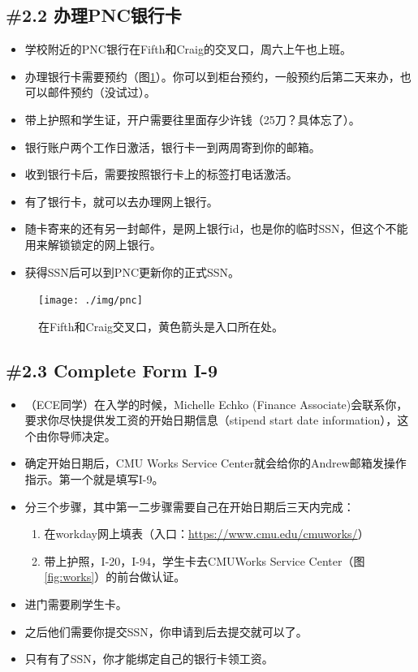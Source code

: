 \documentclass[letterpaper,10pt]{article}
\begin{document}
	\subsection*{\#2.2 办理PNC银行卡}
	
	\begin{itemize}
		\item 学校附近的PNC银行在Fifth和Craig的交叉口，周六上午也上班。
		\item 办理银行卡需要预约（图\ref{fig:pnc}）。你可以到柜台预约，一般预约后第二天来办，也可以邮件预约（没试过）。
		\item 带上护照和学生证，开户需要往里面存少许钱（25刀？具体忘了）。
		\item 银行账户两个工作日激活，银行卡一到两周寄到你的邮箱。
		\item 收到银行卡后，需要按照银行卡上的标签打电话激活。
		\item 有了银行卡，就可以去办理网上银行。
		\item 随卡寄来的还有另一封邮件，是网上银行id，也是你的临时SSN，但这个不能用来解锁锁定的网上银行。
		\item 获得SSN后可以到PNC更新你的正式SSN。
	\end{itemize}
	
	\begin{figure}[!h]
		\centering
		\texttt{[image: ./img/pnc]}
		\caption{在Fifth和Craig交叉口，黄色箭头是入口所在处。}
		\label{fig:pnc}
	\end{figure}
	
	\subsection*{\#2.3 Complete Form I-9}
	
	\begin{itemize}
		\item （ECE同学）在入学的时候，Michelle Echko (Finance Associate)会联系你，要求你尽快提供发工资的开始日期信息（stipend start date information），这个由你导师决定。
		\item 确定开始日期后，CMU Works Service Center就会给你的Andrew邮箱发操作指示。第一个就是填写I-9。
		\item 分三个步骤，其中第一二步骤需要自己在开始日期后三天内完成：
		\begin{enumerate}
			\item 在workday网上填表（入口：\url{https://www.cmu.edu/cmuworks/}）
			\item 带上护照，I-20，I-94，学生卡去CMUWorks Service Center（图\ref{fig:works}）的前台做认证。
		\end{enumerate}
		\item 进门需要刷学生卡。
		\item 之后他们需要你提交SSN，你申请到后去提交就可以了。
		\item 只有有了SSN，你才能绑定自己的银行卡领工资。
	\end{itemize}
	
\end{document}
